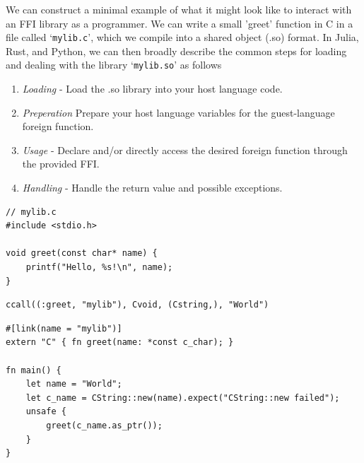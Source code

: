 We can construct a minimal example of what it might look like to interact with an FFI library as a programmer. We can write a small 'greet' function in C in a file called `\texttt{mylib.c}', which we compile into a shared object (.so) format. In Julia, Rust, and Python, we can then broadly describe the common steps for loading and dealing with the library `\texttt{mylib.so}' as follows 
\begin{enumerate}
  \item \textit{Loading} - Load the .so library into your host language code.
  \item \textit{Preperation} Prepare your host language variables for the guest-language foreign function.
  \item \textit{Usage} - Declare and/or directly access the desired foreign function through the provided FFI.
  \item \textit{Handling} - Handle the return value and possible exceptions.
\end{enumerate}   

\begin{listing}[ht!]
\begin{verbatim}
// mylib.c
#include <stdio.h>

void greet(const char* name) {
    printf("Hello, %s!\n", name);
}
\end{verbatim}
  \caption{FFI Example in C}
  \label{listing:ffi_example_c}
\end{listing}

\begin{listing}[ht!]
\begin{verbatim}
ccall((:greet, "mylib"), Cvoid, (Cstring,), "World")
\end{verbatim}
  \caption{FFI Example in Julia using the standard ccall function}
  \label{listing:ffi_example_julia}
\end{listing}

\begin{listing}[ht!]
\begin{verbatim}
#[link(name = "mylib")]
extern "C" { fn greet(name: *const c_char); }

fn main() {
    let name = "World";
    let c_name = CString::new(name).expect("CString::new failed");
    unsafe {
        greet(c_name.as_ptr());
    }
}
\end{verbatim}
  \caption{FFI Example in Rust using extern and the link attribute for the library}
  \label{listing:ffi_example_rust}
\end{listing}

